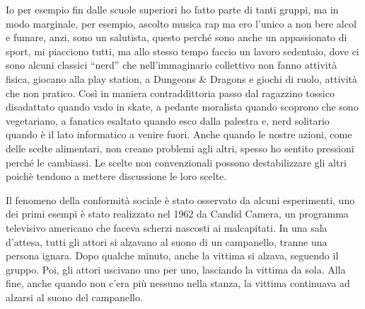 \documentclass[12pt]{book} %
\begin{document}
Io per esempio fin dalle scuole superiori ho fatto parte di tanti gruppi, ma in modo marginale, per esempio,
ascolto musica rap ma ero l'unico a non bere alcol e fumare, anzi, sono un salutista,
questo perché sono anche un appassionato di sport, mi piacciono tutti, ma allo stesso tempo faccio un lavoro sedentaio, dove ci sono alcuni classici “nerd” che nell'immaginario collettivo non fanno attività fisica, giocano alla play station, a Dungeons \& Dragons e giochi di ruolo, attività che non pratico. Così in maniera contraddittoria passo dal ragazzino tossico disadattato quando
vado in skate, a pedante moralista quando scoprono che sono vegetariano, a fanatico esaltato quando esco dalla palestra
e, nerd solitario quando è il lato informatico a venire fuori.
Anche quando le nostre azioni, come delle scelte alimentari, non creano problemi agli altri, spesso ho sentito pressioni perché le cambiassi.
Le scelte non convenzionali possono destabilizzare gli altri poichè tendono a mettere discussione le loro scelte.

Il fenomeno della conformità sociale è stato osservato da alcuni esperimenti, uno dei primi esempi è stato realizzato nel 1962 da Candid Camera, un programma televisivo americano che faceva scherzi nascosti ai malcapitati. In una sala d'attesa, tutti gli attori si alzavano al suono di un campanello, tranne una persona ignara. Dopo qualche minuto, anche la vittima si alzava, seguendo il gruppo. Poi, gli attori uscivano uno per uno, lasciando la vittima da sola. Alla fine, anche quando non c'era più nessuno nella stanza, la vittima continuava ad alzarsi al suono del campanello.
\end{document}
